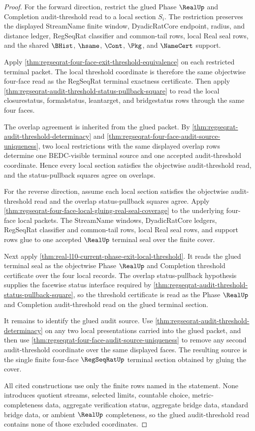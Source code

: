 \begin{proof}
For the forward direction, restrict the glued Phase $\RealUp$ and Completion audit-threshold read to a local section $S_i$. The restriction preserves the displayed StreamName finite window, DyadicRatCore endpoint, radius, and distance ledger, RegSeqRat classifier and common-tail rows, local Real seal rows, and the shared $\BHist$, $\hsame$, $\Cont$, $\Pkg$, and $\NameCert$ support.

Apply \autoref{thm:regseqrat-four-face-exit-threshold-equivalence} on each restricted terminal packet. The local threshold coordinate is therefore the same objectwise four-face read as the RegSeqRat terminal exactness certificate. Then apply \autoref{thm:regseqrat-audit-threshold-status-pullback-square} to read the local closurestatus, formalstatus, leantarget, and bridgestatus rows through the same four faces.

The overlap agreement is inherited from the glued packet. By \autoref{thm:regseqrat-audit-threshold-determinacy} and \autoref{thm:regseqrat-four-face-audit-source-uniqueness}, two local restrictions with the same displayed overlap rows determine one BEDC-visible terminal source and one accepted audit-threshold coordinate. Hence every local section satisfies the objectwise audit-threshold read, and the status-pullback squares agree on overlaps.

For the reverse direction, assume each local section satisfies the objectwise audit-threshold read and the overlap status-pullback squares agree. Apply \autoref{thm:regseqrat-four-face-local-gluing-real-seal-coverage} to the underlying four-face local packets. The StreamName windows, DyadicRatCore ledgers, RegSeqRat classifier and common-tail rows, local Real seal rows, and support rows glue to one accepted $\RealUp$ terminal seal over the finite cover.

Next apply \autoref{thm:real-l10-current-phase-exit-local-threshold}. It reads the glued terminal seal as the objectwise Phase $\RealUp$ and Completion threshold certificate over the four local records. The overlap status-pullback hypothesis supplies the facewise status interface required by \autoref{thm:regseqrat-audit-threshold-status-pullback-square}, so the threshold certificate is read as the Phase $\RealUp$ and Completion audit-threshold read on the glued terminal section.

It remains to identify the glued audit source. Use \autoref{thm:regseqrat-audit-threshold-determinacy} on any two local presentations carried into the glued packet, and then use \autoref{thm:regseqrat-four-face-audit-source-uniqueness} to remove any second audit-threshold coordinate over the same displayed faces. The resulting source is the single finite four-face $\RegSeqRatUp$ terminal section obtained by gluing the cover.

All cited constructions use only the finite rows named in the statement. None introduces quotient streams, selected limits, countable choice, metric-completeness data, aggregate verification status, aggregate bridge data, standard bridge data, or ambient $\RealUp$ completeness, so the glued audit-threshold read contains none of those excluded coordinates.
\end{proof}

